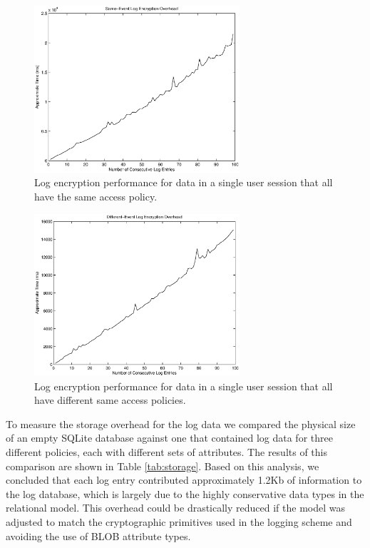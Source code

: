 \documentclass{sig-alternate}
\begin{document}
\begin{figure}[ht!]
\begin{center}
\includegraphics[width=3in]{images/logPerf.eps}
\caption{Log encryption performance for data in a single user session that all have the same access policy.}
\label{fig:logPerf}
\end{center}
\end{figure}

\begin{figure}[ht!]
\begin{center}
\includegraphics[width=3in]{images/logPerfDiffEvents.eps}
\caption{Log encryption performance for data in a single user session that all have different same access policies.}
\label{fig:logPerfDiffEvents}
\end{center}
\end{figure}

To measure the storage overhead for the log data we compared the physical size of an empty SQLite database against
one that contained log data for three different policies, each with different sets of attributes. The results of
this comparison are shown in Table \ref{tab:storage}. Based on this analysis, we concluded that each log entry contributed
approximately 1.2Kb of information to the log database, which is largely due to the highly conservative data types in the relational model.
This overhead could be drastically reduced if the model was adjusted to match the cryptographic primitives used in
the logging scheme and avoiding the use of BLOB attribute types.
\end{document}
